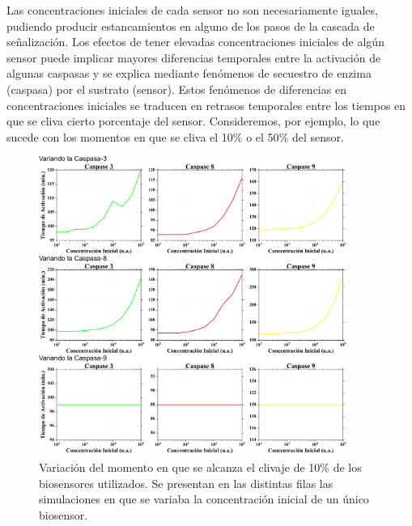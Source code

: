 Las concentraciones iniciales de cada sensor no son necesariamente iguales, pudiendo producir estancamientos en alguno de los pasos de la cascada de señalización. Los efectos de tener elevadas concentraciones iniciales de algún sensor puede implicar mayores diferencias temporales entre la activación de algunas caspasas y se explica mediante fenómenos de secuestro de enzima (caspasa) por el sustrato (sensor). Estos fenómenos de diferencias en concentraciones iniciales se traducen en retrasos temporales entre los tiempos en que se cliva cierto porcentaje del sensor. Consideremos, por ejemplo, lo que sucede con los momentos en que se cliva el 10$\%$ o el 50$\%$ del sensor. 

\begin{figure}
    \centering
    \includegraphics[width=0.9\textwidth]{./img/Cap3/Varcp10.png}
    \caption{Variación del momento en que se alcanza el clivaje de 10$\%$ de los biosensores utilizados. Se presentan en las distintas filas las simulaciones en que se variaba la concentración inicial de un único biosensor.}
    \label{fig:varcp10}
\end{figure}

